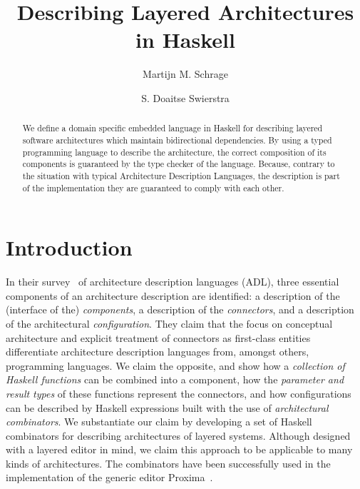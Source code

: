 \documentclass{llncs}
\renewcommand{\emph}[1]{{\em #1}}
\begin{document}
\title{Describing Layered Architectures in Haskell}

\author{Martijn M. Schrage \and S. Doaitse Swierstra}

\maketitle

\begin{abstract}
We define a domain specific embedded language in Haskell for describing
layered software architectures which maintain bidirectional dependencies. By using a typed programming
language to describe the architecture, the correct composition of its components
is guaranteed by the type checker of the language. Because, contrary to the situation with typical Architecture Description Languages, the
description is part of the implementation they are guaranteed to comply with each other.
\end{abstract}



\section{Introduction}\label{sect:introduction}

In their survey~\cite{medvidovic00ADLs} of architecture description languages (ADL), three essential components of an architecture description are identified: a description of the (interface of the) \emph{components}, a description of the \emph{connectors}, and a description of the architectural \emph{configuration}. They claim that the focus on conceptual architecture and explicit treatment of connectors as first-class entities differentiate architecture description languages from, amongst others, programming languages. We claim the opposite, and show how a \emph{collection of Haskell functions} can be combined into a component, how the \emph{parameter and result types} of these functions represent the connectors, and how configurations can be described by Haskell expressions built with the use of \emph{architectural combinators}. We substantiate our claim by developing a set of Haskell combinators for describing architectures of layered systems. Although designed with a layered editor in mind, we claim this approach to be applicable to many kinds of architectures. The combinators have been successfully used in the implementation of the generic editor Proxima~\cite{Schrage04Proxima}.
\end{document}
